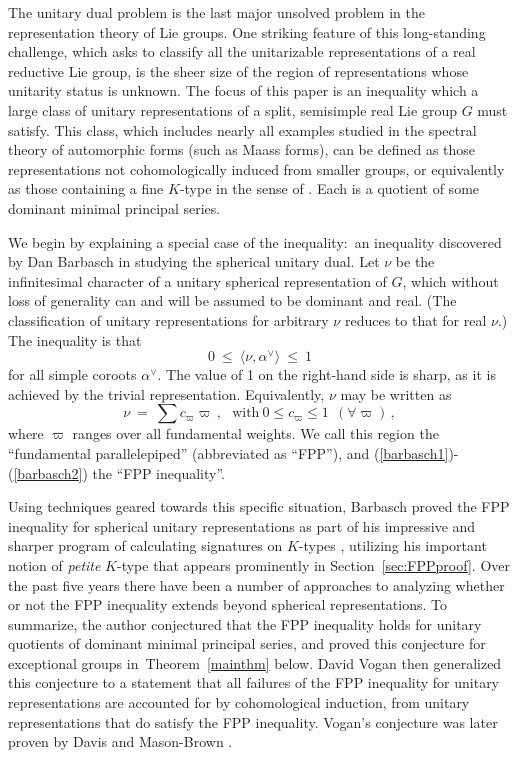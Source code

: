 \documentclass[12pt]{article}
\newcommand{\thmref}[1]{Theorem~\ref{#1}}
\newcommand{\secref}[1]{Section~\ref{#1}}
\numberwithin{equation}{section}
\renewcommand\({\left(}
\renewcommand\){\right)}
\begin{document}
The unitary dual problem is the last major unsolved problem in the representation theory of Lie groups.  One striking feature of this long-standing challenge, which asks to classify all the unitarizable representations of a real reductive Lie group, is the sheer size of the region of representations whose unitarity status is unknown.  The focus of this paper is an inequality which a large class of unitary representations of a split, semisimple real Lie group  $G$ must satisfy.  This class, which includes  nearly all examples studied in the spectral theory of automorphic forms (such as Maass forms), can be defined as those representations not cohomologically induced from  smaller groups, or equivalently as those containing a fine $K$-type in the sense of \cite{BGG}.  Each is a quotient
 of some dominant minimal principal series.  

We begin by explaining a special case of the inequality:~an inequality discovered by Dan Barbasch in studying the spherical unitary dual.  Let $\nu$ be the infinitesimal character of a unitary spherical representation of $G$, which without loss of generality can and will be assumed to be dominant and real.  (The classification of unitary representations for arbitrary $\nu$ reduces to that for real $\nu$.) The inequality is that
\begin{equation}\label{barbasch1}
  0 \ \le \ \langle \nu,\alpha^\vee \rangle \ \le \ 1
\end{equation}
for all simple coroots $\alpha^\vee$.  The value of 1 on the right-hand side is sharp, as it is achieved  by the trivial representation.
Equivalently, $\nu$ may be written as
\begin{equation}\label{barbasch2}
  \nu \ = \ \sum c_\varpi \varpi\,, \ \  \ \text{with} \ 0 \le c_\varpi \le 1 \ \ (\forall \varpi)\,,
\end{equation}
where
$\varpi$ ranges over all fundamental weights.  We call this region the ``fundamental parallelepiped'' (abbreviated as ``FPP''), and   (\ref{barbasch1})-(\ref{barbasch2}) the ``FPP inequality''.

Using techniques geared towards this specific situation, Barbasch   proved the FPP inequality for spherical unitary representations as part of his impressive and sharper program of calculating signatures on $K$-types \cite{BarbaschSph}, utilizing his important notion of {\em petite} $K$-type \cite{petite} that appears prominently in \secref{sec:FPPproof}.  Over the past five years there have been a number of approaches to analyzing whether or not the FPP inequality extends beyond spherical representations.  To summarize, the author conjectured that the FPP inequality holds for unitary quotients of dominant minimal principal series, and proved this conjecture for exceptional groups in~\thmref{mainthm} below. David Vogan then generalized this conjecture to a statement that all failures of the FPP inequality for unitary representations are accounted for by cohomological induction, from unitary representations that do satisfy the FPP inequality.  Vogan's conjecture was later proven by Davis and Mason-Brown \cite{DM-B}.
\end{document}
